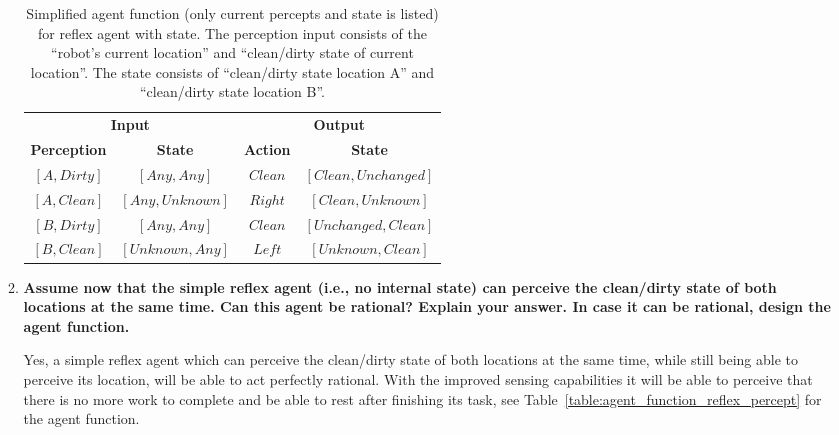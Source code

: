 \begin{enumerate}
\begin{enumerate}
\begin{table}
\begin{center}
\begin{tabular}{cc|cc}
\multicolumn{2}{c|}{\bfseries{Input}} & \multicolumn{2}{c}{\bfseries{Output}}\\
\bfseries{Perception} & \bfseries{State} & \bfseries{Action} & \bfseries{State}\\
\hline
$\mathit{[A, Dirty]}$ & $\mathit{[Any, Any]}$ & $\mathit{Clean}$ & $\mathit{[Clean, Unchanged]}$ \\
$\mathit{[A, Clean]}$ & $\mathit{[Any, Unknown]}$ & $\mathit{Right}$ & $\mathit{[Clean, Unknown]}$ \\
$\mathit{[B, Dirty]}$ & $\mathit{[Any, Any]}$ & $\mathit{Clean}$ & $\mathit{[Unchanged, Clean]}$ \\
$\mathit{[B, Clean]}$ & $\mathit{[Unknown, Any]}$ & $\mathit{Left}$ & $\mathit{[Unknown, Clean]}$ \\
\end{tabular}
\caption{Simplified agent function (only current percepts and state is listed) for reflex agent with state. The perception input consists of the ``robot's current location'' and ``clean/dirty state of current location''. The state consists of ``clean/dirty state location A'' and ``clean/dirty state location B''. }
\label{table:agent_function_reflex_state}
\end{center}
\end{table}

\item \textbf{Assume now that the simple reflex agent (i.e., no internal state) can perceive the clean/dirty state of both locations at the same time. Can this agent be rational? Explain your answer. In case it can be rational, design the agent function.}\nopagebreak

Yes, a simple reflex agent which can perceive the clean/dirty state of both locations at the same time, while still being able to perceive its location, will be able to act perfectly rational. With the improved sensing capabilities it will be able to perceive that there is no more work to complete and be able to rest after finishing its task, see Table~\ref{table:agent_function_reflex_percept} for the agent function.


\end{enumerate}
\end{enumerate}
